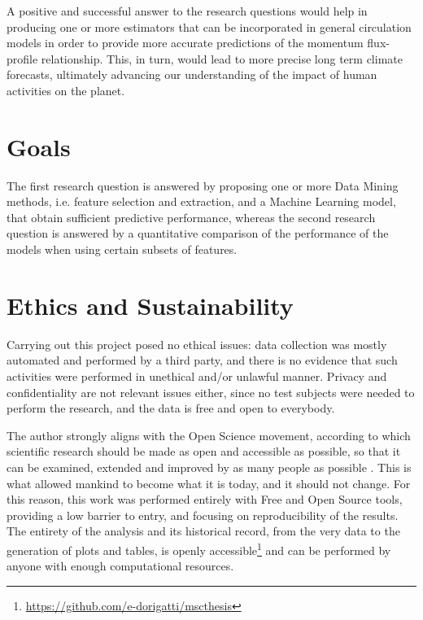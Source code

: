 \documentclass[a4paper,11pt]{kth-mag}
\begin{document}
A positive and successful answer to the research questions would help in producing one or more estimators that can be incorporated in general circulation models in order to provide more accurate predictions of the momentum flux-profile relationship. This, in turn, would lead to more precise long term climate forecasts, ultimately advancing our understanding of the impact of human activities on the planet.

\section{Goals}
\label{sec:goals}
The first research question is answered by proposing one or more Data Mining methods, i.e. feature selection and extraction, and a Machine Learning model, that obtain sufficient predictive performance, whereas the second research question is answered by a quantitative comparison of the performance of the models when using certain subsets of features.


\section{Ethics and Sustainability}
\label{sec:ethics}
Carrying out this project posed no ethical issues: data collection was mostly automated and performed by a third party, and there is no evidence that such activities were performed in unethical and/or unlawful manner. Privacy and confidentiality are not relevant issues either, since no test subjects were needed to perform the research, and the data is free and open to everybody.

The author strongly aligns with the Open Science movement, according to which scientific research should be made as open and accessible as possible, so that it can be examined, extended and improved by as many people as possible \citep{fiveopenscience}. This is what allowed mankind to become what it is today, and it should not change. For this reason, this work was performed entirely with Free and Open Source tools, providing a low barrier to entry, and focusing on reproducibility of the results. The entirety of the analysis and its historical record, from the very data to the generation of plots and tables, is openly accessible\footnote{\url{https://github.com/e-dorigatti/mscthesis}} and can be performed by anyone with enough computational resources.
\end{document}
